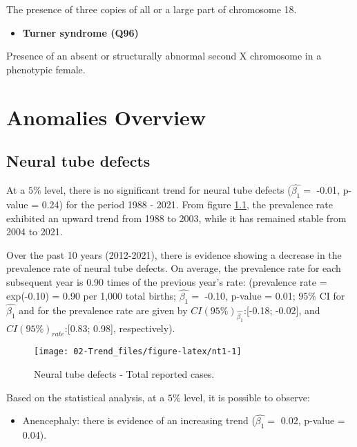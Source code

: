\documentclass[
]{krantz}
\providecommand{\tightlist}{%
  \setlength{\itemsep}{0pt}\setlength{\parskip}{0pt}}
\begin{document}
The presence of three copies of all or a large part of chromosome 18.

\begin{itemize}
\tightlist
\item
  \textbf{Turner syndrome (Q96)}
\end{itemize}

Presence of an absent or structurally abnormal second X chromosome in a phenotypic female.

\hypertarget{chapter3}{%
\chapter{Anomalies Overview}\label{chapter3}}

\hypertarget{section32}{%
\section{Neural tube defects}\label{section32}}

At a \(5\%\) level, there is no significant trend for neural tube defects (\(\hat{\beta_{1}} =\) -0.01, p-value = 0.24) for the period 1988 - 2021. From figure \ref{fig:nt1}, the prevalence rate exhibited an upward trend from 1988 to 2003, while it has remained stable from 2004 to 2021.

Over the past 10 years (2012-2021), there is evidence showing a decrease in the prevalence rate of neural tube defects. On average, the prevalence rate for each subsequent year is 0.90 times of the previous year's rate: (prevalence rate = exp(-0.10) = 0.90 per 1,000 total births; \(\hat{\beta_{1}} =\) -0.10, p-value = 0.01; \(95\%\) CI for \(\hat{\beta_{1}}\) and for the prevalence rate are given by \(CI(95\%)_{\hat{\beta_{1}}}\):{[}-0.18; -0.02{]}, and \(CI(95\%)_{rate}\):{[}0.83; 0.98{]}, respectively).

\begin{figure}[h]

{\centering \texttt{[image: 02-Trend\_files/figure-latex/nt1-1]} 

}

\caption{Neural tube defects - Total reported cases.}\label{fig:nt1}
\end{figure}

Based on the statistical analysis, at a \(5\%\) level, it is possible to observe:

\begin{itemize}
\tightlist
\item
  Anencephaly: there is evidence of an increasing trend (\(\hat{\beta_{1}} =\) 0.02, p-value = 0.04).
\end{itemize}
\end{document}
